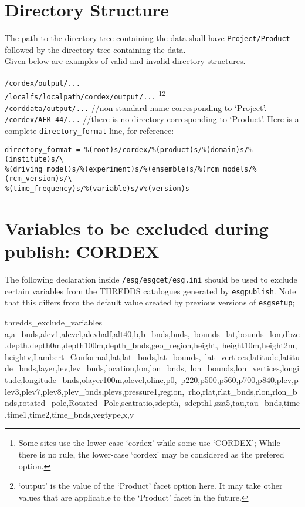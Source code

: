 \section{Directory Structure}
The path to the directory tree containing the data shall have \texttt{Project/Product} followed by the directory tree containing the data. \\
Given below are examples of valid and invalid directory structures.\\
\vspace{0mm}\\
\texttt{/cordex/output/...} \cmark\\
\texttt{/localfs/localpath/cordex/output/...} \cmark \footnote{Some sites use the lower-case `cordex' while some use `CORDEX'; While there is no rule, the lower-case `cordex' may be considered as the prefered option.}\footnote{`output' is the value of the `Product' facet option here. It may take other values that are applicable to the `Product' facet in the future.} \\
\texttt{/corddata/output/...} \xmark{ } //non-standard name corresponding to `Project'.  \\ 
\texttt{/cordex/AFR-44/...} \xmark{ } //there is no directory corresponding to `Product'. Here is a complete \texttt{directory\_format} line, for reference:
\begin{verbatim}
directory_format = %(root)s/cordex/%(product)s/%(domain)s/%(institute)s/\
%(driving_model)s/%(experiment)s/%(ensemble)s/%(rcm_models/%(rcm_version)s/\
%(time_frequency)s/%(variable)s/v%(version)s
\end{verbatim}

\section{Variables to be excluded during publish: CORDEX}
\label{skipvars}

The following declaration inside \texttt{/esg/esgcet/esg.ini} should be used to exclude certain variables from the THREDDS catalogues generated by \texttt{esgpublish}.  Note that this differs from the default value created by previous versions of \texttt{esgsetup}; 

\begin{verbatimtab}[4]
thredds_exclude_variables = a,a_bnds,alev1,alevel,alevhalf,alt40,b,b_bnds,bnds,\
bounds_lat,bounds_lon,dbze,depth,depth0m,depth100m,depth_bnds,geo_region,height,\
height10m,height2m,heightv,Lambert_Conformal,lat,lat_bnds,lat_bounds,\
lat_vertices,latitude,latitude_bnds,layer,lev,lev_bnds,location,lon,lon_bnds,\
lon_bounds,lon_vertices,longitude,longitude_bnds,olayer100m,olevel,oline,p0,\
p220,p500,p560,p700,p840,plev,plev3,plev7,plev8,plev_bnds,plevs,pressure1,region,\
rho,rlat,rlat_bnds,rlon,rlon_bnds,rotated_pole,Rotated_Pole,scatratio,sdepth,\
sdepth1,sza5,tau,tau_bnds,time,time1,time2,time_bnds,vegtype,x,y
\end{verbatimtab}

